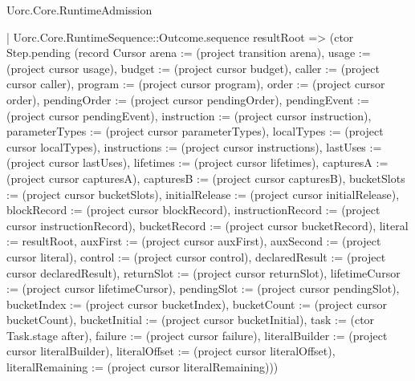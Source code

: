\begin{lexlean}{Uorc.Core.RuntimeAdmission}
\begin{semanticmodule}
{        | Uorc.Core.RuntimeSequence::Outcome.sequence resultRoot => (ctor Step.pending (record Cursor {arena := (project transition arena), usage := (project cursor usage), budget := (project cursor budget), caller := (project cursor caller), program := (project cursor program), order := (project cursor order), pendingOrder := (project cursor pendingOrder), pendingEvent := (project cursor pendingEvent), instruction := (project cursor instruction), parameterTypes := (project cursor parameterTypes), localTypes := (project cursor localTypes), instructions := (project cursor instructions), lastUses := (project cursor lastUses), lifetimes := (project cursor lifetimes), capturesA := (project cursor capturesA), capturesB := (project cursor capturesB), bucketSlots := (project cursor bucketSlots), initialRelease := (project cursor initialRelease), blockRecord := (project cursor blockRecord), instructionRecord := (project cursor instructionRecord), bucketRecord := (project cursor bucketRecord), literal := resultRoot, auxFirst := (project cursor auxFirst), auxSecond := (project cursor literal), control := (project cursor control), declaredResult := (project cursor declaredResult), returnSlot := (project cursor returnSlot), lifetimeCursor := (project cursor lifetimeCursor), pendingSlot := (project cursor pendingSlot), bucketIndex := (project cursor bucketIndex), bucketCount := (project cursor bucketCount), bucketInitial := (project cursor bucketInitial), task := (ctor Task.stage after), failure := (project cursor failure), literalBuilder := (project cursor literalBuilder), literalOffset := (project cursor literalOffset), literalRemaining := (project cursor literalRemaining)}))
}
\end{semanticmodule}
\end{lexlean}

